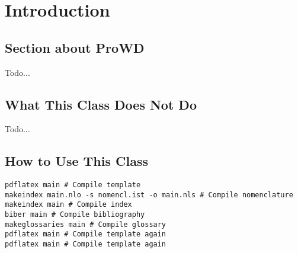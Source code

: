 \setchapterpreamble[u]{\margintoc}
\chapter{Introduction}

\section{Section about ProWD}

Todo...



\section{What This Class Does Not Do}

Todo...



\section{How to Use This Class}

\begin{lstlisting}[style=kaolstplain,linewidth=1.5\textwidth]
pdflatex main # Compile template
makeindex main.nlo -s nomencl.ist -o main.nls # Compile nomenclature
makeindex main # Compile index
biber main # Compile bibliography
makeglossaries main # Compile glossary
pdflatex main # Compile template again
pdflatex main # Compile template again
\end{lstlisting}


